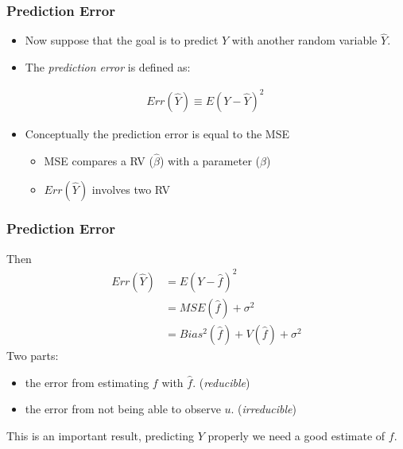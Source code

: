 \documentclass[
  shownotes,
  xcolor={svgnames},
  hyperref={colorlinks,citecolor=DarkBlue,linkcolor=DarkRed,urlcolor=DarkBlue}
  ]{beamer}
\begin{document}
\begin{frame}
\frametitle{Prediction Error}

\begin{itemize}
  \item Now suppose that the goal is to predict $Y$ with another random variable $\hat Y$.
  \bigskip
  \item The \emph{prediction error} is defined as:
\end{itemize}
  \bigskip

  \begin{align}
    Err(\hat Y) \equiv E\left(Y-\hat Y\right)^2\
  \end{align}

\begin{itemize}
  \item Conceptually the prediction error is equal to the MSE
  \bigskip
  \begin{itemize}
  \item MSE compares a RV ($\hat \beta$) with a parameter ($\beta$)
  \bigskip
  \item  $Err(\hat Y)$  involves two RV 
  \end{itemize}
\end{itemize}



\end{frame}


\begin{frame}
\frametitle{Prediction Error}


\bigskip
Then 
\begin{align}
  Err (\hat Y )  &= E(Y-\hat f)^2  \\
                 &= MSE(\hat f) + \sigma^2  \\
                 &= Bias^2(\hat f) + V(\hat f) + \sigma^2
\end{align}
\bigskip
Two parts:
\begin{itemize}
  \item  the error from estimating $f$ with $\hat f$. (\emph{reducible})
  \item  the error from not being able to observe $u$. (\emph{irreducible})
\end{itemize}

\bigskip

This is an important result, predicting $Y$ properly we need a good estimate of $f$.

\end{frame}
\end{document}
